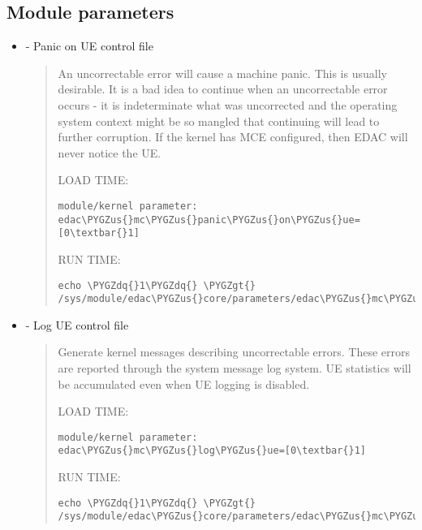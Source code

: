 \documentclass[a4paper,8pt,english]{sphinxmanual}
\def\PYGZus{\char`\_}
\def\PYGZgt{\char`\>}
\def\PYGZdq{\char`\"}
\begin{document}
\subsection{Module parameters}
\label{admin-guide/ras:module-parameters}\begin{itemize}
\item {} 
 - Panic on UE control file
\begin{quote}

An uncorrectable error will cause a machine panic.  This is usually
desirable.  It is a bad idea to continue when an uncorrectable error
occurs - it is indeterminate what was uncorrected and the operating
system context might be so mangled that continuing will lead to further
corruption. If the kernel has MCE configured, then EDAC will never
notice the UE.

LOAD TIME:

\begin{Verbatim}[commandchars=\\\{\}]
module/kernel parameter: edac\PYGZus{}mc\PYGZus{}panic\PYGZus{}on\PYGZus{}ue=[0\textbar{}1]
\end{Verbatim}

RUN TIME:

\begin{Verbatim}[commandchars=\\\{\}]
echo \PYGZdq{}1\PYGZdq{} \PYGZgt{} /sys/module/edac\PYGZus{}core/parameters/edac\PYGZus{}mc\PYGZus{}panic\PYGZus{}on\PYGZus{}ue
\end{Verbatim}
\end{quote}

\item {} 
 - Log UE control file
\begin{quote}

Generate kernel messages describing uncorrectable errors.  These errors
are reported through the system message log system.  UE statistics
will be accumulated even when UE logging is disabled.

LOAD TIME:

\begin{Verbatim}[commandchars=\\\{\}]
module/kernel parameter: edac\PYGZus{}mc\PYGZus{}log\PYGZus{}ue=[0\textbar{}1]
\end{Verbatim}

RUN TIME:

\begin{Verbatim}[commandchars=\\\{\}]
echo \PYGZdq{}1\PYGZdq{} \PYGZgt{} /sys/module/edac\PYGZus{}core/parameters/edac\PYGZus{}mc\PYGZus{}log\PYGZus{}ue
\end{Verbatim}
\end{quote}


\end{itemize}
\end{document}
